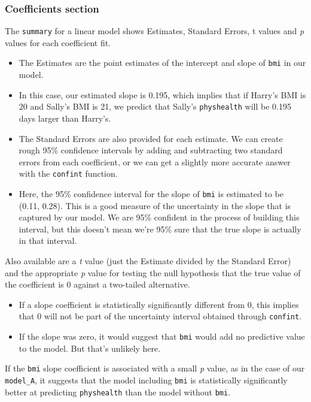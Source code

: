 \documentclass[]{book}
\providecommand{\tightlist}{%
  \setlength{\itemsep}{0pt}\setlength{\parskip}{0pt}}
\theoremstyle{definition}
\theoremstyle{definition}
\theoremstyle{definition}
\theoremstyle{remark}
\begin{document}
\subsubsection{Coefficients section}\label{coefficients-section}

The \texttt{summary} for a linear model shows Estimates, Standard
Errors, t values and \emph{p} values for each coefficient fit.

\begin{itemize}
\tightlist
\item
  The Estimates are the point estimates of the intercept and slope of
  \texttt{bmi} in our model.
\item
  In this case, our estimated slope is 0.195, which implies that if
  Harry's BMI is 20 and Sally's BMI is 21, we predict that Sally's
  \texttt{physhealth} will be 0.195 days larger than Harry's.
\item
  The Standard Errors are also provided for each estimate. We can create
  rough 95\% confidence intervals by adding and subtracting two standard
  errors from each coefficient, or we can get a slightly more accurate
  answer with the \texttt{confint} function.
\item
  Here, the 95\% confidence interval for the slope of \texttt{bmi} is
  estimated to be (0.11, 0.28). This is a good measure of the
  uncertainty in the slope that is captured by our model. We are 95\%
  confident in the process of building this interval, but this doesn't
  mean we're 95\% sure that the true slope is actually in that interval.
\end{itemize}

Also available are a \emph{t} value (just the Estimate divided by the
Standard Error) and the appropriate \emph{p} value for testing the null
hypothesis that the true value of the coefficient is 0 against a
two-tailed alternative.

\begin{itemize}
\tightlist
\item
  If a slope coefficient is statistically significantly different from
  0, this implies that 0 will not be part of the uncertainty interval
  obtained through \texttt{confint}.
\item
  If the slope was zero, it would suggest that \texttt{bmi} would add no
  predictive value to the model. But that's unlikely here.
\end{itemize}

If the \texttt{bmi} slope coefficient is associated with a small
\emph{p} value, as in the case of our \texttt{model\_A}, it suggests
that the model including \texttt{bmi} is statistically significantly
better at predicting \texttt{physhealth} than the model without
\texttt{bmi}.
\end{document}
